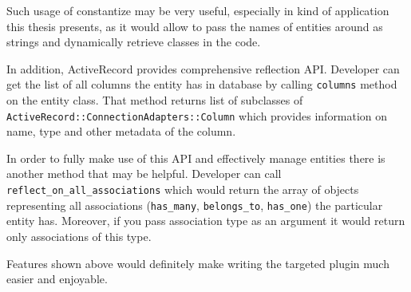       
      
      Such usage of constantize may be very useful, especially in kind of application this thesis
      presents, as it would allow to pass the names of entities around as strings and dynamically retrieve
      classes in the code.
      
      In addition, ActiveRecord provides comprehensive reflection API. Developer can get the list of all
      columns the entity has in database by calling \texttt{columns} method on the entity class. That method 
      returns list of subclasses of \texttt{ActiveRecord::ConnectionAdapters::Column} which provides
      information on name, type and other metadata of the column.
      
      In order to fully make use of this API and effectively manage entities there is another method 
      that may be helpful. Developer can call \texttt{reflect\_on\_all\_associations} which would 
      return the array of objects representing all associations (\texttt{has\_many}, 
      \texttt{belongs\_to}, \texttt{has\_one}) the 
      particular entity has. Moreover, if you pass association type as an argument it would return only
      associations of this type.
      
      Features shown above would definitely make writing the targeted plugin much easier and enjoyable.
      
    
      
      
      
      
        
      
      
      
      